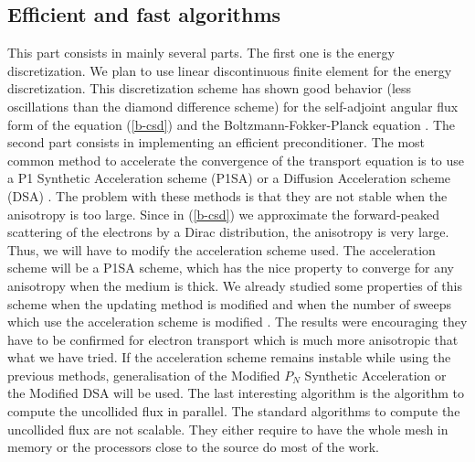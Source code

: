 \subsection{Efficient and fast algorithms}
This part consists in mainly several parts. The first one is the energy
discretization. We plan to use linear discontinuous finite element for the
energy discretization. This discretization scheme has shown good behavior
(less oscillations than the diamond difference scheme) for the self-adjoint
angular flux form of the equation (\ref{b-csd}) \cite{saaf} and the 
Boltzmann-Fokker-Planck equation \cite{fem}. The second part consists in
implementing an efficient preconditioner. The most common method to accelerate the
convergence of the transport equation is to use a P1 Synthetic Acceleration
scheme (P1SA) or a Diffusion Acceleration scheme (DSA) \cite{adams}. The
problem with these methods is that they are not stable when the anisotropy is
too large. Since in (\ref{b-csd}) we approximate the forward-peaked scattering
of the electrons by a Dirac distribution, the anisotropy is very large. Thus,
we will have to modify the acceleration scheme used. The acceleration scheme
will be a P1SA scheme, which has the nice property to converge for any
anisotropy when the medium is thick. We already studied some properties of
this scheme when the updating method is modified \cite{russe} and when the
number of sweeps which use the acceleration scheme is modified
\cite{multisweep}. The results were encouraging they have to be confirmed for
electron transport which is much more anisotropic that what we have tried. If
the acceleration scheme remains instable while using the previous methods,
generalisation of the Modified $P_N$ Synthetic Acceleration or the Modified
DSA \cite{kassem} will be used. The last interesting algorithm is the
algorithm to compute the uncollided flux in parallel. The standard algorithms
to compute the uncollided flux are not scalable. They either require to have
the whole mesh in memory or the processors close to the source do most of the
work.

